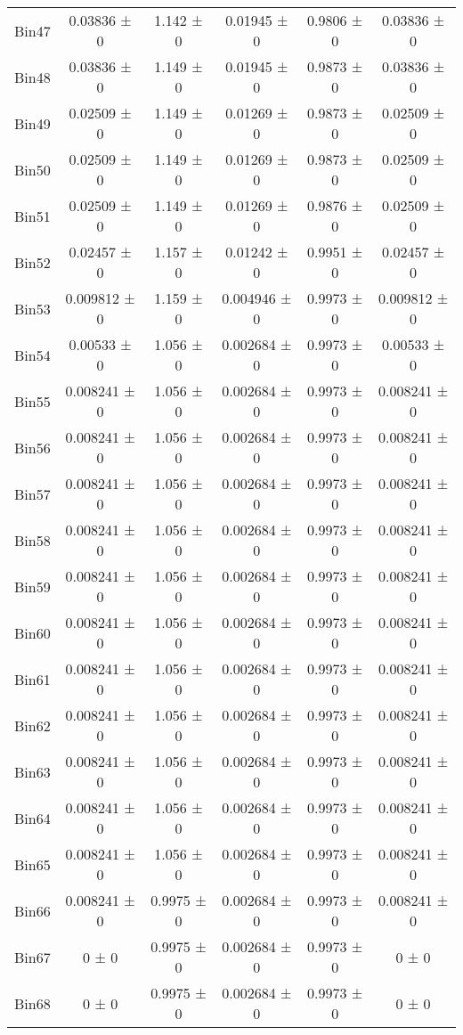 \begin{tabular}{@{\extracolsep{4pt}}lccccc@{}}
     Bin47 & 0.03836 ± 0 & 1.142 ± 0 & 0.01945 ± 0 & 0.9806 ± 0 & 0.03836 ± 0 \\ 
     Bin48 & 0.03836 ± 0 & 1.149 ± 0 & 0.01945 ± 0 & 0.9873 ± 0 & 0.03836 ± 0 \\ 
     Bin49 & 0.02509 ± 0 & 1.149 ± 0 & 0.01269 ± 0 & 0.9873 ± 0 & 0.02509 ± 0 \\ 
     Bin50 & 0.02509 ± 0 & 1.149 ± 0 & 0.01269 ± 0 & 0.9873 ± 0 & 0.02509 ± 0 \\ 
     Bin51 & 0.02509 ± 0 & 1.149 ± 0 & 0.01269 ± 0 & 0.9876 ± 0 & 0.02509 ± 0 \\ 
     Bin52 & 0.02457 ± 0 & 1.157 ± 0 & 0.01242 ± 0 & 0.9951 ± 0 & 0.02457 ± 0 \\ 
     Bin53 & 0.009812 ± 0 & 1.159 ± 0 & 0.004946 ± 0 & 0.9973 ± 0 & 0.009812 ± 0 \\ 
     Bin54 & 0.00533 ± 0 & 1.056 ± 0 & 0.002684 ± 0 & 0.9973 ± 0 & 0.00533 ± 0 \\ 
     Bin55 & 0.008241 ± 0 & 1.056 ± 0 & 0.002684 ± 0 & 0.9973 ± 0 & 0.008241 ± 0 \\ 
     Bin56 & 0.008241 ± 0 & 1.056 ± 0 & 0.002684 ± 0 & 0.9973 ± 0 & 0.008241 ± 0 \\ 
     Bin57 & 0.008241 ± 0 & 1.056 ± 0 & 0.002684 ± 0 & 0.9973 ± 0 & 0.008241 ± 0 \\ 
     Bin58 & 0.008241 ± 0 & 1.056 ± 0 & 0.002684 ± 0 & 0.9973 ± 0 & 0.008241 ± 0 \\ 
     Bin59 & 0.008241 ± 0 & 1.056 ± 0 & 0.002684 ± 0 & 0.9973 ± 0 & 0.008241 ± 0 \\ 
     Bin60 & 0.008241 ± 0 & 1.056 ± 0 & 0.002684 ± 0 & 0.9973 ± 0 & 0.008241 ± 0 \\ 
     Bin61 & 0.008241 ± 0 & 1.056 ± 0 & 0.002684 ± 0 & 0.9973 ± 0 & 0.008241 ± 0 \\ 
     Bin62 & 0.008241 ± 0 & 1.056 ± 0 & 0.002684 ± 0 & 0.9973 ± 0 & 0.008241 ± 0 \\ 
     Bin63 & 0.008241 ± 0 & 1.056 ± 0 & 0.002684 ± 0 & 0.9973 ± 0 & 0.008241 ± 0 \\ 
     Bin64 & 0.008241 ± 0 & 1.056 ± 0 & 0.002684 ± 0 & 0.9973 ± 0 & 0.008241 ± 0 \\ 
     Bin65 & 0.008241 ± 0 & 1.056 ± 0 & 0.002684 ± 0 & 0.9973 ± 0 & 0.008241 ± 0 \\ 
     Bin66 & 0.008241 ± 0 & 0.9975 ± 0 & 0.002684 ± 0 & 0.9973 ± 0 & 0.008241 ± 0 \\ 
     Bin67 & 0 ± 0 & 0.9975 ± 0 & 0.002684 ± 0 & 0.9973 ± 0 & 0 ± 0 \\ 
     Bin68 & 0 ± 0 & 0.9975 ± 0 & 0.002684 ± 0 & 0.9973 ± 0 & 0 ± 0 \\ 

\end{tabular}

